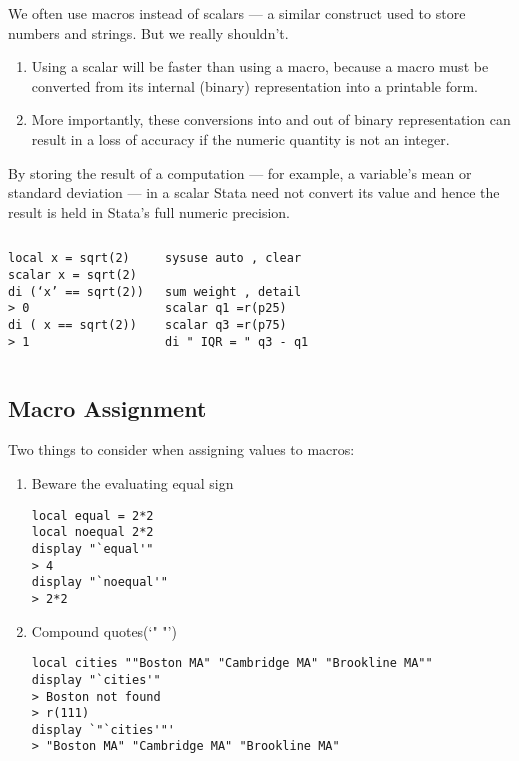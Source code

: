 \documentclass[fleqn, handout, 10pt]{beamer}
\begin{document}
\begin{frame}[fragile]
    We often use macros instead of scalars --- a similar construct used to store numbers and strings. But we really shouldn't.
    \begin{enumerate}
       \item Using a scalar will be faster than using a macro, because a macro must be converted from its internal (binary) representation into a printable form.
       \item More importantly, these conversions into and out of binary representation can result in a loss of accuracy if the numeric quantity is not an integer.
    \end{enumerate}
    By storing the result of a computation --- for example, a variable's mean or standard deviation --- in a scalar Stata need not convert its value and hence the result is held in Stata's full numeric precision.
    \begin{columns}[t]
    \centering
	    \begin{lstlisting}
local x = sqrt(2)
scalar x = sqrt(2)
di (‘x’ == sqrt(2))
> 0
di ( x == sqrt(2))
> 1
	    \end{lstlisting}
	    \begin{lstlisting}
sysuse auto , clear

sum weight , detail
scalar q1 =r(p25)
scalar q3 =r(p75)
di " IQR = " q3 - q1
	    \end{lstlisting}
    \end{columns}

\end{frame}

\subsection{Macro Assignment}

\begin{frame}[fragile]
    Two things to consider when assigning values to macros:
    \begin{enumerate}
        \item Beware the evaluating equal sign
            \begin{lstlisting}
local equal = 2*2
local noequal 2*2
display "`equal'"
> 4
display "`noequal'"
> 2*2
            \end{lstlisting}
        \item Compound quotes(`" "')
            \begin{lstlisting}
local cities ""Boston MA" "Cambridge MA" "Brookline MA""
display "`cities'"
> Boston not found
> r(111)
display `"`cities'"'
> "Boston MA" "Cambridge MA" "Brookline MA"
            \end{lstlisting}
    \end{enumerate}
\end{frame}
\end{document}
